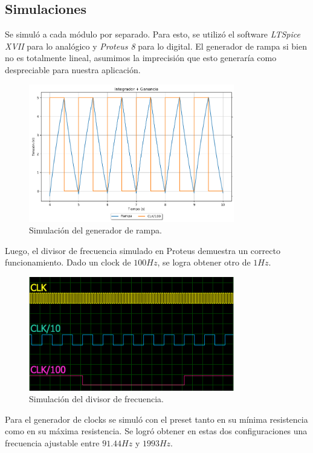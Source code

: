 \subsection{Simulaciones}
Se simuló a cada módulo por separado. Para esto, se utilizó el software \textit{LTSpice XVII} para lo analógico y \textit{Proteus 8} para lo digital. 
El generador de rampa si bien no es totalmente lineal, asumimos la imprecisión que esto generaría como despreciable para nuestra aplicación.
\begin{figure}[H]
\centering
\includegraphics[width=0.8\textwidth]{Imagenes/sqare.png}
\caption{Simulación del generador de rampa.}
\label{sim:ramp}
\end{figure}
Luego, el divisor de frecuencia simulado en Proteus demuestra un correcto funcionamiento. Dado un clock de $100Hz$, se logra obtener otro de $1Hz$.
\begin{figure}[H]
\centering
\includegraphics[width=0.8\textwidth]{Imagenes/freqdiv.png}
\caption{Simulación del divisor de frecuencia.}
\label{sim:freqdiv}
\end{figure}
Para el generador de clocks se simuló con el preset tanto en su mínima resistencia como en su máxima resistencia. Se logró obtener en estas dos configuraciones una frecuencia ajustable entre $91.44Hz$ y $1993Hz$.
